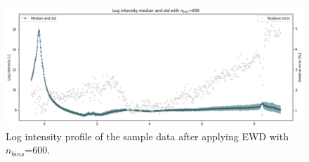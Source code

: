 \documentclass[11pt,a4paper]{article}
\numberwithin{equation}{section}
\numberwithin{figure}{section}
\numberwithin{table}{section}
\begin{document}
\begin{figure}[H]
    \centering
    \includegraphics[width=155mm]{plots/ewd.png}
    \caption{Log intensity profile of the sample data after applying EWD with $n_{bins}$=600.}
    \label{ranges}
\end{figure}



\end{document}
